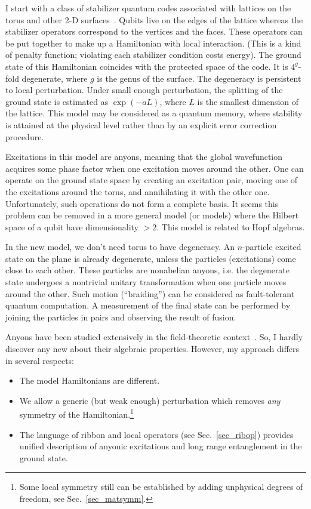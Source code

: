 \documentclass[12pt]{article}
\begin{document}
I start with a class of stabilizer quantum codes associated with lattices on
the torus and other 2-D surfaces~\cite{Kit1,Kit2}. Qubits live on the 
edges of the lattice whereas the stabilizer operators correspond to the 
vertices and the faces. These operators can be put together to make up a 
Hamiltonian with local interaction. (This is a kind of penalty function; 
violating each stabilizer condition costs energy). The ground state of this 
Hamiltonian coincides with the protected space of the code. It is $4^g$-fold 
degenerate, where $g$ is the genus of the surface. The degeneracy is 
persistent to local perturbation. Under small enough perturbation, the 
splitting of the ground state is estimated as $\exp(-aL)$, where $L$ is the 
smallest dimension of the lattice. This model may be considered as a quantum 
memory, where stability is attained at the physical level rather than by an 
explicit error correction procedure.

Excitations in this model are anyons, meaning that the global wavefunction 
acquires some phase factor when one excitation moves around the other. One 
can operate on the ground state space by creating an excitation pair, moving 
one of the excitations around the torus, and annihilating it with the other 
one. Unfortunately, such operations do not form a complete basis. It seems 
this problem can be removed in a more general model (or models) where the 
Hilbert space of a qubit have dimensionality $>2$. This model is related to 
Hopf algebras.

In the new model, we don't need torus to have degeneracy. An $n$-particle
excited state on the plane is already degenerate, unless the particles
(excitations) come close to each other. These particles are nonabelian anyons,
i.e. the degenerate state undergoes a nontrivial unitary transformation when
one particle moves around the other. Such motion (``braiding'') can be 
considered as fault-tolerant quantum computation. A measurement of the final 
state can be performed by joining the particles in pairs and observing the 
result of fusion.

Anyons have been studied extensively in the field-theoretic
context~\cite{Wil,DPR,BDP,BP,LP}. So, I hardly discover any new about their
algebraic properties. However, my approach differs in several respects:
\begin{itemize}
\item The model Hamiltonians are different.
\item We allow a generic (but weak enough) perturbation which removes 
\emph{any} symmetry of the Hamiltonian.\footnote{
 Some local symmetry still can be established by adding unphysical degrees of 
freedom, see Sec.~\ref{sec_matsymm}.}
\item The language of ribbon and local operators (see Sec.~\ref{sec_ribop}) 
provides unified description of anyonic excitations and long range 
entanglement in the ground state.
\end{itemize}
\end{document}
